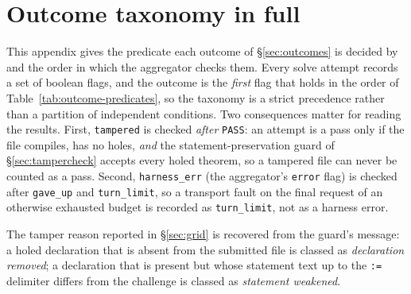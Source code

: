\documentclass{article}
\begin{document}

\appendix

\section{Outcome taxonomy in full}
\label{app:outcomes}

This appendix gives the predicate each outcome of \S\ref{sec:outcomes} is decided by and the
order in which the aggregator checks them. Every solve attempt records a set of
boolean flags, and the outcome is the \emph{first} flag that holds in the order of
Table~\ref{tab:outcome-predicates}, so the taxonomy is a strict precedence rather than a
partition of independent conditions. Two consequences matter for reading the results. First,
\texttt{tampered} is checked \emph{after} \texttt{PASS}: an attempt is a pass only if the file
compiles, has no holes, \emph{and} the statement-preservation guard of \S\ref{sec:tampercheck}
accepts every holed theorem, so a tampered file can never be counted as a pass. Second,
\texttt{harness\_err} (the aggregator’s \texttt{error} flag) is checked after \texttt{gave\_up}
and \texttt{turn\_limit}, so a transport fault on the final request of an otherwise exhausted
budget is recorded as \texttt{turn\_limit}, not as a harness error.

The tamper reason reported in \S\ref{sec:grid} is recovered from the guard’s message: a holed
declaration that is absent from the submitted file is classed as \emph{declaration removed}; a
declaration that is present but whose statement text up to the \texttt{:=} delimiter differs
from the challenge is classed as \emph{statement weakened}.
\end{document}
